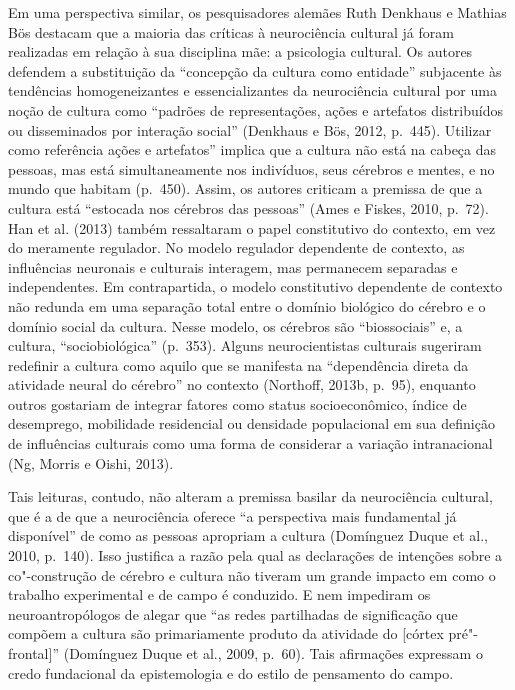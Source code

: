 Em uma perspectiva similar, os pesquisadores alemães Ruth Denkhaus e
Mathias Bös destacam que a maioria das críticas à neurociência cultural
já foram realizadas em relação à sua disciplina mãe: a psicologia
cultural. Os autores defendem a substituição da ``concepção da cultura
como entidade'' subjacente às tendências homogeneizantes e
essencializantes da neurociência cultural por uma noção de cultura como
``padrões de representações, ações e artefatos distribuídos ou
disseminados por interação social'' (Denkhaus e Bös, 2012, p.~445).
Utilizar como referência ações e artefatos'' implica que a cultura não
está na cabeça das pessoas, mas está simultaneamente nos indivíduos,
seus cérebros e mentes, e no mundo que habitam (p.~450). Assim, os
autores criticam a premissa de que a cultura está ``estocada nos
cérebros das pessoas'' (Ames e Fiskes, 2010, p.~72). Han et al. (2013)
também ressaltaram o papel constitutivo do contexto, em vez do meramente
regulador. No modelo regulador dependente de contexto, as influências
neuronais e culturais interagem, mas permanecem separadas e
independentes. Em contrapartida, o modelo constitutivo dependente de
contexto não redunda em uma separação total entre o domínio biológico do
cérebro e o domínio social da cultura. Nesse modelo, os cérebros são
``biossociais'' e, a cultura, ``sociobiológica'' (p.~353). Alguns
neurocientistas culturais sugeriram redefinir a cultura como aquilo que
se manifesta na ``dependência direta da atividade neural do cérebro'' no
contexto (Northoff, 2013b, p.~95), enquanto outros gostariam de integrar
fatores como status socioeconômico, índice de desemprego, mobilidade
residencial ou densidade populacional em sua definição de influências
culturais como uma forma de considerar a variação intranacional (Ng,
Morris e Oishi, 2013).

Tais leituras, contudo, não alteram a premissa basilar da neurociência
cultural, que é a de que a neurociência oferece ``a perspectiva mais
fundamental já disponível'' de como as pessoas apropriam a cultura
(Domínguez Duque et al., 2010, p.~140). Isso justifica a razão pela qual
as declarações de intenções sobre a co"-construção de cérebro e cultura
não tiveram um grande impacto em como o trabalho experimental e de campo
é conduzido. E nem impediram os neuroantropólogos de alegar que ``as
redes partilhadas de significação que compõem a cultura são
primariamente produto da atividade do  {[}córtex pré"-frontal{]}''
(Domínguez Duque et al., 2009, p.~60). Tais afirmações expressam o credo
fundacional da epistemologia e do estilo de pensamento do campo.

